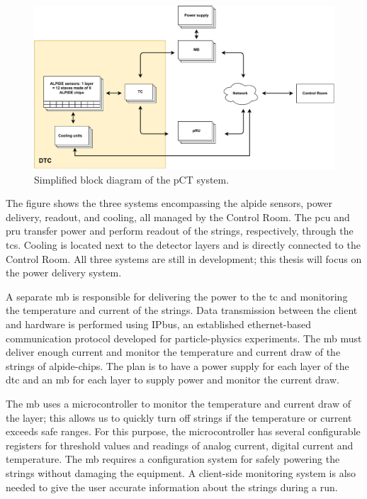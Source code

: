 \documentclass[main.tex]{subfiles}
\begin{document}
\begin{figure}[!htpb]
    \centering
    \includegraphics[scale = 0.65]{images/dcs_concept_renewed.pdf}
    \caption{Simplified block diagram of the pCT system.}
    \label{fig: dcs_renewed}
\end{figure}
\FloatBarrier

The figure shows the three systems encompassing the \gls{alpide} sensors, power delivery, readout, and cooling, all managed by the Control Room. The \gls{pcu} and \gls{pru} transfer power and perform readout of the strings, respectively, through the \gls{tc}s. Cooling is located next to the detector layers and is directly connected to the Control Room. All three systems are still in development; this thesis will focus on the power delivery system.

A separate \gls{mb} is responsible for delivering the power to the \gls{tc} and monitoring the temperature and current of the strings. Data transmission between the client and hardware is performed using IPbus, an established ethernet-based communication protocol developed for particle-physics experiments. The \gls{mb} must deliver enough current and monitor the temperature and current draw of the strings of \gls{alpide}-chips. The plan is to have a power supply for each layer of the \gls{dtc} and an \gls{mb} for each layer to supply power and monitor the current draw. \par

The \gls{mb} uses a microcontroller to monitor the temperature and current draw of the layer; this allows us to quickly turn off strings if the temperature or current exceeds safe ranges. For this purpose, the microcontroller has several configurable registers for threshold values and readings of analog current, digital current and temperature. The \gls{mb} requires a configuration system for safely powering the strings without damaging the equipment. A client-side monitoring system is also needed to give the user accurate information about the strings during a run.
\end{document}
